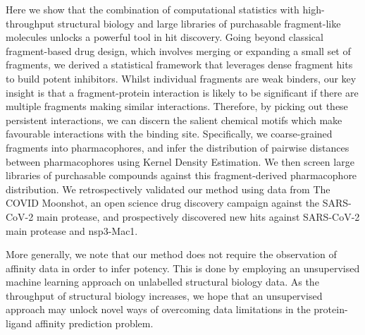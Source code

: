 Here we show that the combination of computational statistics with high-throughput structural biology and large libraries of purchasable fragment-like molecules unlocks a powerful tool in hit discovery. Going beyond classical fragment-based drug design, which involves merging or expanding a small set of fragments, we derived a statistical framework that leverages dense fragment hits to build potent inhibitors. Whilst individual fragments are weak binders, our key insight is that a fragment-protein interaction is likely to be significant if there are multiple fragments making similar interactions. Therefore, by picking out these persistent interactions, we can discern the salient chemical motifs which make favourable interactions with the binding site. Specifically, we coarse-grained fragments into pharmacophores, and infer the distribution of pairwise distances between pharmacophores using Kernel Density Estimation. We then screen large libraries of purchasable compounds against this fragment-derived pharmacophore distribution. We retrospectively validated our method using data from The COVID Moonshot, an open science drug discovery campaign against the SARS-CoV-2 main protease, and prospectively discovered new hits against SARS-CoV-2 main protease and nsp3-Mac1.


More generally, we note that our method does not require the observation of affinity data in order to infer potency. This is done by employing an unsupervised machine learning approach on unlabelled structural biology data. As the throughput of structural biology increases, we hope that an unsupervised approach may unlock novel ways of overcoming data limitations in the protein-ligand affinity prediction problem.

